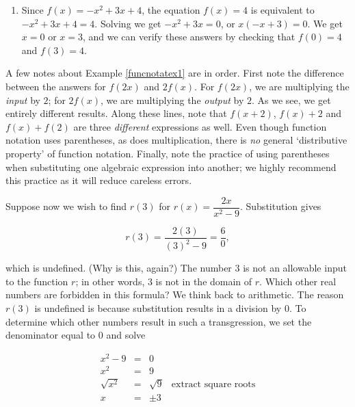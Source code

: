 {\begin{enumerate}
\begin{enumerate}
From our work above, we see $f(2) = 6$ so that

\[ \begin{array}{rclr}  
f(x) + f(2) & = & \left(-x^2 + 3x + 4\right) + 6  & \\
            & = & -x^2 + 3x + 10 \\ 
            \end{array} \]

\end{enumerate}

\item   Since $f(x) = -x^2 + 3x + 4$, the equation $f(x) = 4$ is equivalent to $-x^2+3x+4 = 4$. Solving we get $-x^2+3x = 0$, or $x(-x+3) = 0$.  We get $x=0$ or $x=3$, and we can verify these answers by checking that $f(0) = 4$ and $f(3) = 4$.   
         
\end{enumerate}
}

\medskip

A few notes about Example \ref{funcnotatex1} are in order.  First note the difference between the answers for $f(2x)$ and $2f(x)$.  For $f(2x)$, we are multiplying the \textit{input} by $2$;  for $2 f(x)$, we are multiplying the \textit{output} by $2$.  As we see, we get entirely different results.  Along these lines, note that $f(x+2)$, $f(x) + 2$ and $f(x) + f(2)$ are three \textit{different} expressions as well.  Even though function notation uses parentheses, as does multiplication, there is \textit{no} general `distributive property' of function notation. Finally, note the practice of using parentheses when substituting one algebraic expression into another;  we highly recommend this practice as it will reduce careless errors. 

\smallskip

Suppose now we wish to find $r(3)$ for $r(x) = \dfrac{2x}{x^2 - 9}$.  Substitution gives

\[r(3) = \dfrac{2(3)}{(3)^2-9} = \dfrac{6}{0},\]

which is undefined. (Why is this, again?) The number $3$ is not an allowable input to the function $r$;  in other words, $3$ is not in the domain of $r$.  Which other real numbers are forbidden in this formula?  We think back to arithmetic.  The reason $r(3)$ is undefined is because substitution results in a division by $0$.  To determine which other numbers result in such a transgression, we set the denominator equal to $0$ and solve

\[ \begin{array}{rclr}  
x^2 - 9 & = & 0  & \\
x^2 & = & 9 & \\
\sqrt{x^2} & = & \sqrt{9} & \mbox{extract square roots}  \\
x & = & \pm 3 & \\ 
\end{array} \]


